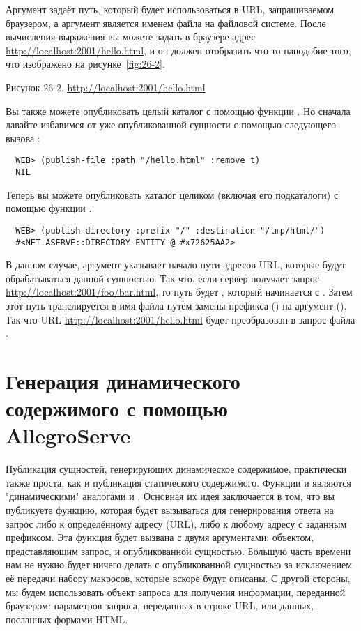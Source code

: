 Аргумент  задаёт путь, который будет использоваться в URL, запрашиваемом
браузером, а аргумент  является именем файла на файловой системе. После
вычисления выражения  вы можете задать в браузере адрес
\url{http://localhost:2001/hello.html}, и он должен отобразить что-то наподобие того, что
изображено на рисунке~\ref{fig:26-2}.

Рисунок 26-2. \url{http://localhost:2001/hello.html}

Вы также можете опубликовать целый каталог с помощью функции . Но
сначала давайте избавимся от уже опубликованной сущности с помощью следующего вызова
:

\begin{lstlisting}
  WEB> (publish-file :path "/hello.html" :remove t)
  NIL
\end{lstlisting}

Теперь вы можете опубликовать каталог  целиком (включая его подкаталоги)
с помощью функции .

\begin{lstlisting}
  WEB> (publish-directory :prefix "/" :destination "/tmp/html/")
  #<NET.ASERVE::DIRECTORY-ENTITY @ #x72625AA2>
\end{lstlisting}

В данном случае, аргумент  указывает начало пути адресов URL, которые будут
обрабатываться данной сущностью. Так что, если сервер получает запрос
\url{http://localhost:2001/foo/bar.html}, то путь будет , который
начинается с \code{/}. Затем этот путь транслируется в имя файла путём замены префикса
(\code{/}) на аргумент  (). Так что URL
\url{http://localhost:2001/hello.html} будет преобразован в запрос файла
.

\section{Генерация динамического содержимого с помощью AllegroServe}

Публикация сущностей, генерирующих динамическое содержимое, практически также проста, как
и публикация статического содержимого. Функции  и 
являются "динамическими" аналогами  и
. Основная их идея заключается в том, что вы публикуете функцию,
которая будет вызываться для генерирования ответа на запрос либо к определённому адресу
(URL), либо к любому адресу с заданным префиксом. Эта функция будет вызвана с двумя
аргументами: объектом, представляющим запрос, и опубликованной сущностью. Большую часть
времени нам не нужно будет ничего делать с опубликованной сущностью за исключением её
передачи набору макросов, которые вскоре будут описаны. С другой стороны, мы будем
использовать объект запроса для получения информации, переданной браузером: параметров
запроса, переданных в строке URL, или данных, посланных формами HTML.

